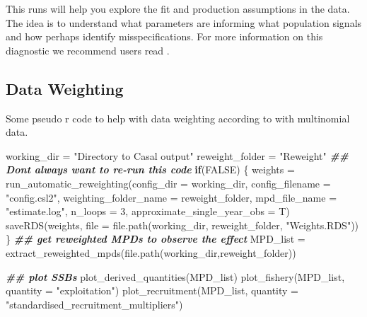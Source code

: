 \documentclass[
]{book}
\newenvironment{Shaded}{\begin{snugshade}}{\end{snugshade}}
\newcommand{\AttributeTok}[1]{\textcolor[rgb]{0.77,0.63,0.00}{#1}}
\newcommand{\ConstantTok}[1]{\textcolor[rgb]{0.00,0.00,0.00}{#1}}
\newcommand{\ControlFlowTok}[1]{\textcolor[rgb]{0.13,0.29,0.53}{\textbf{#1}}}
\newcommand{\DecValTok}[1]{\textcolor[rgb]{0.00,0.00,0.81}{#1}}
\newcommand{\DocumentationTok}[1]{\textcolor[rgb]{0.56,0.35,0.01}{\textbf{\textit{#1}}}}
\newcommand{\FunctionTok}[1]{\textcolor[rgb]{0.00,0.00,0.00}{#1}}
\newcommand{\NormalTok}[1]{#1}
\newcommand{\OtherTok}[1]{\textcolor[rgb]{0.56,0.35,0.01}{#1}}
\newcommand{\StringTok}[1]{\textcolor[rgb]{0.31,0.60,0.02}{#1}}
\begin{document}
This runs will help you explore the fit and production assumptions in the data. The idea is to understand what parameters are informing what population signals and how perhaps identify misspecifications. For more information on this diagnostic we recommend users read \citet{MINTEVERA2017114}.

\hypertarget{data-weighting}{%
\subsection{Data Weighting}\label{data-weighting}}

Some pseudo r code to help with data weighting according to \citet{francis2011data} with multinomial data.

\begin{Shaded}
\begin{Highlighting}[]
\NormalTok{working\_dir }\OtherTok{=} \StringTok{"Directory to Casal output"}
\NormalTok{reweight\_folder }\OtherTok{=} \StringTok{"Reweight"}
\DocumentationTok{\#\# Don\textquotesingle{}t always want to re{-}run this code}
\ControlFlowTok{if}\NormalTok{(}\ConstantTok{FALSE}\NormalTok{) \{}
\NormalTok{  weights }\OtherTok{=} \FunctionTok{run\_automatic\_reweighting}\NormalTok{(}\AttributeTok{config\_dir =}\NormalTok{ working\_dir,}
                                      \AttributeTok{config\_filename =} \StringTok{"config.csl2"}\NormalTok{,}
                                      \AttributeTok{weighting\_folder\_name =}\NormalTok{ reweight\_folder,}
                                      \AttributeTok{mpd\_file\_name =} \StringTok{"estimate.log"}\NormalTok{,}
                                      \AttributeTok{n\_loops =} \DecValTok{3}\NormalTok{, }
                                      \AttributeTok{approximate\_single\_year\_obs =}\NormalTok{ T)}
  \FunctionTok{saveRDS}\NormalTok{(weights, }\AttributeTok{file =} \FunctionTok{file.path}\NormalTok{(working\_dir, reweight\_folder, }\StringTok{"Weights.RDS"}\NormalTok{))}
\NormalTok{\}}
\DocumentationTok{\#\# get reweighted MPDs to observe the effect}
\NormalTok{MPD\_list }\OtherTok{=} \FunctionTok{extract\_reweighted\_mpds}\NormalTok{(}\FunctionTok{file.path}\NormalTok{(working\_dir,reweight\_folder))}

\DocumentationTok{\#\# plot SSBs}
\FunctionTok{plot\_derived\_quantities}\NormalTok{(MPD\_list)}
\FunctionTok{plot\_fishery}\NormalTok{(MPD\_list, }\AttributeTok{quantity =} \StringTok{"exploitation"}\NormalTok{)}
\FunctionTok{plot\_recruitment}\NormalTok{(MPD\_list, }\AttributeTok{quantity =} \StringTok{"standardised\_recruitment\_multipliers"}\NormalTok{)}
\end{Highlighting}
\end{Shaded}
\end{document}
